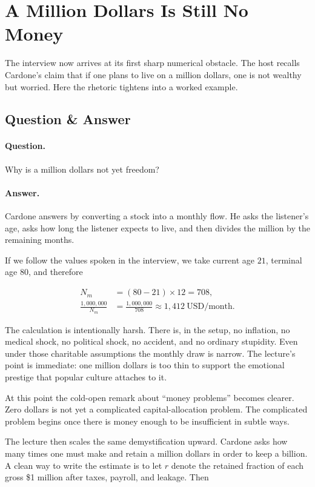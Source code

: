 \section{A Million Dollars Is Still No Money}

The interview now arrives at its first sharp numerical obstacle. The host recalls Cardone's claim that if one plans to live on a million dollars, one is not wealthy but worried. Here the rhetoric tightens into a worked example.

\subsection{Question \& Answer}

\paragraph{Question.}
Why is a million dollars not yet freedom?

\paragraph{Answer.}
Cardone answers by converting a stock into a monthly flow. He asks the listener's age, asks how long the listener expects to live, and then divides the million by the remaining months.

If we follow the values spoken in the interview, we take current age \(21\), terminal age \(80\), and therefore

\begin{align}
N_m &= (80-21)\times 12 = 708,\\
\frac{1{,}000{,}000}{N_m}
&= \frac{1{,}000{,}000}{708}
\approx 1{,}412\ \text{USD/month}.
\end{align}

The calculation is intentionally harsh. There is, in the setup, no inflation, no medical shock, no political shock, no accident, and no ordinary stupidity. Even under those charitable assumptions the monthly draw is narrow. The lecture's point is immediate: one million dollars is too thin to support the emotional prestige that popular culture attaches to it.

At this point the cold-open remark about ``money problems'' becomes clearer. Zero dollars is not yet a complicated capital-allocation problem. The complicated problem begins once there is money enough to be insufficient in subtle ways.

The lecture then scales the same demystification upward. Cardone asks how many times one must make and retain a million dollars in order to keep a billion. A clean way to write the estimate is to let \(r\) denote the retained fraction of each gross \$1 million after taxes, payroll, and leakage. Then

